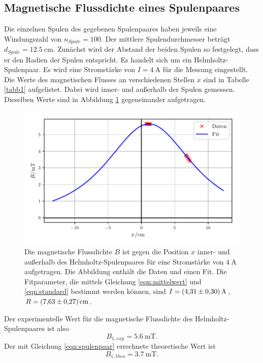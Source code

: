 \subsection{Magnetische Flussdichte eines Spulenpaares}
Die einzelnen Spulen des gegebenen Spulenpaares haben jeweils
eine Windungszahl von $n_{Spule} = \num{100}$. Der mittlere
Spulendurchmesser beträgt $d_{Spule} = \SI{12.5}{\centi\meter}$.
\newline
Zunächst wird der Abstand der beiden Spulen so festgelegt, dass
er den Radien der Spulen entspricht. Es handelt sich um ein
Helmholtz-Spulenpaar.
Es wird eine Stromstärke von $I = \SI{4}{\ampere}$ für die
Messung eingestellt.
Die Werte des magnetischen Flusses an verschiedenen Stellen
$x$ sind in Tabelle \ref{tabb1} aufgelistet. Dabei wird inner-
und außerhalb der Spulen gemessen.
Dieselben Werte sind in Abbildung \ref{plotb1} gegeneinander
aufgetragen.


\begin{figure}
    \centering
    \includegraphics{build/plotb1.pdf}
    \caption{Die magnetische Flussdichte $B$ ist gegen die Position $x$ inner-
    und außerhalb des Helmholtz-Spulenpaares für eine Stromstärke von
    $\SI{4}{\ampere}$ aufgetragen. Die Abbildung enthält die Daten und einen Fit.
    Die Fitparameter, die mittels Gleichung \eqref{eqn:mittelwert} und \eqref{eqn:standard}
    bestimmt werden können, sind $I = \SI{4.31 \pm 0.30}{\ampere}$, 
    $R = \SI{7.63 \pm 0.27}{\centi\meter}$.}
    \label{plotb1}
\end{figure}

\noindent Der experimentelle Wert für die magnetische Flussdichte
des Helmholtz-Spulenpaares ist also
\begin{equation*}
   B_{1,exp} = \SI{5.6}{\milli\tesla}.
\end{equation*}
Der mit Gleichung \eqref{eqn:spulenpaar} errechnete theoretische
Wert ist 
\begin{equation*}
   B_{1,theo} = \SI{3.7}{\milli\tesla}.
\end{equation*}

